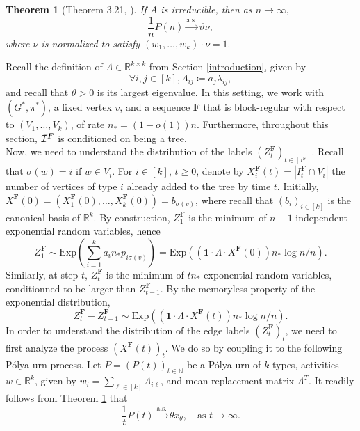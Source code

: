 \documentclass[11pt]{article}
\numberwithin{equation}{section}
\newtheorem{theorem}{Theorem}[section]
\newcommand{\toas}{\overset {\mathrm{a.s.}}{\longrightarrow}}
\theoremstyle{definition}
\newcommand\bN{{\mathbb N}}
\newcommand\bR{{\mathbb R}}
\newcommand\cI{{\cal{I}}}
\begin{document}
\begin{theorem}[Theorem 3.21, \cite{J04}]
\label{PU_Janson}
    If $A$ is irreducible, then as $n\to \infty,$
    $$\frac{1}{n}P(n) \toas \vartheta\nu, $$
    where $\nu$ is normalized to satisfy $(w_1,\ldots,w_k)\cdot \nu=1.$
\end{theorem}

Recall the definition of $\Lambda \in \bR^{k \times k}$ from Section \ref{introduction}, given by
$$\forall i,j\in [k], \Lambda_{ij} \coloneqq a_j \lambda_{ij},$$
and recall that $\theta > 0$ is its largest eigenvalue. In this setting, we work with $(G^*,\pi^*)$, a fixed vertex $v$, and a sequence $\boldsymbol{F}$ that is block-regular with respect to $(V_1,\ldots,V_k)$, of rate $n_* = (1-o(1))n$. Furthermore, throughout this section, $\cI^{\boldsymbol{F}}$ is conditioned on being a tree. \\

Now, we need to understand the distribution of the labels $(Z^{\boldsymbol{F}}_t)_{t \in [\tau^{\boldsymbol{F}}]}$. Recall that $\sigma(w)= i $ if $w \in V_i$. For $i \in [k]$, $t \geq 0$, denote by $X^{\boldsymbol{F}}_i(t) = |I^{\boldsymbol{F}}_t \cap V_i|$ the number of vertices of type $i$ already added to the tree by time $t$. Initially, $X^{\boldsymbol{F}}(0) = (X^{\boldsymbol{F}}_1(0),\ldots,X^{\boldsymbol{F}}_k(0)) = b_{\sigma(v)}$, where recall that $(b_i)_{i\in [k]}$ is the canonical basis of $\bR^k$. By construction, $Z^{\boldsymbol{F}}_1$ is the minimum of $n-1$ independent exponential random variables, hence 
$$Z^{\boldsymbol{F}}_1 \sim \textrm{Exp}\left(\sum_{i=1}^k a_i n_* p_{i\sigma(v)} \right) = \textrm{Exp}( (\boldsymbol{1} \cdot \Lambda \cdot X^{\boldsymbol{F}}(0))n_*\log n/n ). $$ 
Similarly, at step $t$, $Z^{\boldsymbol{F}}_t$ is the minimum of $tn_*$ exponential random variables, conditionned to be larger than $Z^{\boldsymbol{F}}_{t-1}$. By the memoryless property of the exponential distribution, 
\begin{equation}
\label{eq:Z}
Z^{\boldsymbol{F}}_t-Z^{\boldsymbol{F}}_{t-1} \sim \textrm{Exp}( ( \boldsymbol{1}\cdot \Lambda \cdot X^{\boldsymbol{F}}(t))n_*\log n/n ).
\end{equation}
In order to understand the distribution of the edge labels $(Z^{\boldsymbol{F}}_t)_t$, we need to first analyze the process $(X^{\boldsymbol{F}}(t))_t$. We do so by coupling it to the following P\' olya urn process. Let $P=(P(t))_{t\in\bN}$ be a P\' olya urn of $k$ types, activities $w \in \bR^k$, given by $w_i = \sum_{\ell \in [k]} \Lambda_{i\ell} $, and mean replacement matrix $\Lambda^T$. It readily follows from Theorem \ref{PU_Janson} that
\begin{equation}
\label{PU:limit}
\frac{1}{t}P(t) \toas \theta x_\theta, \quad \textrm{as } t\to \infty. 
\end{equation}
\end{document}
